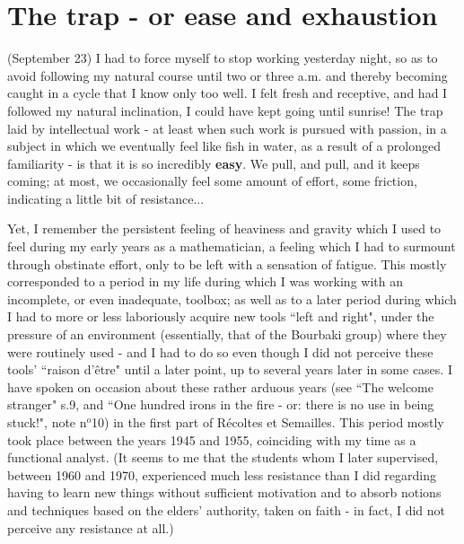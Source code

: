 \label{note:98}

\section{The trap - or ease and exhaustion}

\label{note:99} (September 23) I had to force myself to stop working yesterday night, so as to avoid following my natural course until two or three a.m. and thereby becoming caught in a cycle that I know only too well. I felt fresh and receptive, and had I followed my natural inclination, I could have kept going until sunrise! The trap laid by intellectual work - at least when such work is pursued with passion, in a subject in which we eventually feel like fish in water, as a result of a prolonged familiarity - is that it is so incredibly \textbf{easy}. We pull, and pull, and it keeps coming; at most, we occasionally feel some amount of effort, some friction, indicating a little bit of resistance...

Yet, I remember the persistent feeling of heaviness and gravity which I used to feel during my early years as a mathematician, a feeling which I had to surmount through obstinate effort, only to be left with a sensation of fatigue. This mostly corresponded to a period in my life during which I was working with an incomplete, or even inadequate, toolbox; as well as to a later period during which I had to more or less laboriously acquire new tools ``left and right", under the pressure of an environment (essentially, that of the Bourbaki group) where they were routinely used - and I had to do so even though I did not perceive these tools' ``raison d'\^etre" until a later point, up to several years later in some cases. I have spoken on occasion about these rather arduous years (see ``The welcome stranger" s.9, and ``One hundred irons in the fire - or: there is no use in being stuck!", note n$^o$10) in the first part of R\'ecoltes et Semailles. This period mostly took place between the years 1945 and 1955, coinciding with my time as a functional analyst. (It seems to me that the students whom I later supervised, between 1960 and 1970, experienced much less resistance than I did regarding having to learn new things without sufficient motivation and to absorb notions and techniques based on the elders' authority, taken on faith - in fact, I did not perceive any resistance at all.)

